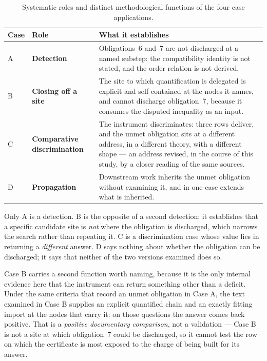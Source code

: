 \documentclass[11pt,a4paper]{article}
\theoremstyle{definition}
\begin{document}
\begin{table}[htbp]
\centering
\small
\renewcommand{\arraystretch}{1.12}
\begin{tabular}{@{}lP{0.20\textwidth}P{0.50\textwidth}@{}}
\toprule
Case & Role & What it establishes \\
\midrule
A & \textbf{Detection} & Obligations~6 and~7 are not discharged at a named
  substep: the compatibility identity is not stated, and the order relation is
  not derived. \\
B & \textbf{Closing off a site} & The site to which quantification is delegated
  is explicit and self-contained at the nodes it names, and cannot discharge
  obligation~7, because it consumes
  the disputed inequality as an input. \\
C & \textbf{Comparative discrimination} & The instrument discriminates: three rows
  deliver, and the unmet obligation sits at a different address, in a different
  theory, with a different shape --- an address revised, in the course of this
  study, by a closer reading of the same sources. \\
D & \textbf{Propagation} & Downstream work inherits the unmet obligation without
  examining it, and in one case extends what is inherited. \\
\bottomrule
\end{tabular}
\caption{Systematic roles and distinct methodological functions of the four case applications.}
\label{tab:applications_roles}
\end{table}

Only A is a detection. B is the opposite of a second detection: it establishes
that a specific candidate site is \emph{not} where the obligation is discharged,
which narrows the search rather than repeating it. C is a discrimination case
whose value lies in returning a \emph{different} answer. D says nothing about
whether the
obligation can be discharged; it says that neither of the two versions examined
does so.

Case B carries a second function worth naming, because it is the only internal
evidence here that the instrument can return something other than a deficit. Under
the same criteria that record an unmet obligation in Case A, the text examined in
Case B supplies an explicit quantified chain and an exactly fitting import at the
nodes that carry it: on those questions the answer comes back positive. That is a
\emph{positive documentary comparison}, not a validation --- Case B is not a site
at which obligation~7 could be discharged, so it cannot test the row on which the
certificate is most exposed to the charge of being built for its answer.
\end{document}
